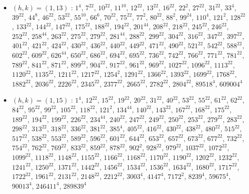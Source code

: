 \begin{itemize}
\item $(h,k)=(1,13)$ : $1^{4}$, $7^{22}$, $10^{22}$, $11^{10}$, $12^{22}$, $13^{22}$, $16^{22}$, $22^{2}$, $27^{22}$, $31^{22}$, $33^{4}$, $39^{22}$, $44^{8}$, $46^{22}$, $53^{22}$, $55^{10}$, $66^{6}$, $70^{22}$, $75^{22}$, $77^{2}$, $80^{22}$, $88^{2}$, $99^{24}$, $110^{4}$, $121^{2}$, $128^{22}$, $133^{22}$, $144^{22}$, $147^{22}$, $175^{22}$, $188^{22}$, $194^{22}$, $201^{44}$, $208^{22}$, $218^{22}$, $245^{22}$, $246^{22}$, $252^{22}$, $258^{44}$, $263^{22}$, $275^{22}$, $279^{22}$, $281^{44}$, $288^{22}$, $299^{22}$, $304^{22}$, $316^{22}$, $347^{22}$, $397^{22}$, $401^{22}$, $421^{22}$, $424^{22}$, $430^{22}$, $436^{22}$, $440^{22}$, $449^{22}$, $471^{22}$, $490^{22}$, $521^{22}$, $542^{22}$, $588^{22}$, $602^{22}$, $609^{22}$, $626^{44}$, $650^{22}$, $686^{22}$, $694^{22}$, $695^{22}$, $736^{22}$, $742^{22}$, $766^{22}$, $771^{22}$, $781^{22}$, $789^{22}$, $841^{22}$, $871^{22}$, $899^{22}$, $904^{22}$, $917^{22}$, $961^{22}$, $969^{22}$, $1027^{22}$, $1096^{22}$, $1113^{22}$, $1120^{22}$, $1135^{22}$, $1211^{22}$, $1217^{22}$, $1254^{2}$, $1291^{22}$, $1366^{22}$, $1393^{22}$, $1699^{22}$, $1768^{22}$, $1882^{22}$, $2036^{22}$, $2226^{22}$, $2345^{22}$, $2377^{22}$, $2665^{22}$, $2782^{22}$, $2804^{22}$, $89518^{4}$, $609004^{4}$
\item $(h,k)=(1,15)$ : $1^{4}$, $12^{22}$, $15^{22}$, $19^{22}$, $20^{22}$, $31^{22}$, $40^{22}$, $53^{22}$, $55^{22}$, $61^{22}$, $62^{22}$, $84^{22}$, $95^{22}$, $99^{22}$, $105^{22}$, $118^{22}$, $121^{2}$, $134^{44}$, $140^{22}$, $143^{22}$, $167^{22}$, $168^{22}$, $175^{22}$, $189^{22}$, $194^{22}$, $199^{22}$, $226^{22}$, $234^{44}$, $240^{22}$, $247^{22}$, $249^{22}$, $250^{22}$, $253^{22}$, $279^{22}$, $283^{22}$, $298^{22}$, $313^{22}$, $318^{22}$, $336^{22}$, $381^{22}$, $385^{4}$, $405^{22}$, $416^{22}$, $430^{22}$, $438^{22}$, $480^{22}$, $515^{22}$, $517^{22}$, $538^{22}$, $553^{22}$, $589^{22}$, $596^{22}$, $601^{22}$, $644^{22}$, $653^{22}$, $657^{22}$, $673^{22}$, $677^{22}$, $732^{22}$, $754^{22}$, $762^{22}$, $769^{22}$, $833^{22}$, $859^{22}$, $878^{22}$, $902^{2}$, $928^{22}$, $979^{22}$, $1037^{22}$, $1072^{22}$, $1099^{22}$, $1118^{22}$, $1148^{22}$, $1155^{22}$, $1166^{22}$, $1168^{22}$, $1170^{22}$, $1190^{22}$, $1202^{22}$, $1232^{22}$, $1241^{22}$, $1250^{22}$, $1371^{22}$, $1442^{22}$, $1456^{22}$, $1534^{22}$, $1536^{22}$, $1634^{22}$, $1680^{22}$, $1717^{22}$, $1722^{22}$, $1961^{22}$, $2131^{22}$, $2148^{22}$, $2212^{22}$, $3003^{4}$, $4147^{4}$, $7172^{2}$, $8239^{4}$, $59675^{4}$, $90013^{4}$, $246411^{4}$, $289839^{4}$

\end{itemize}
